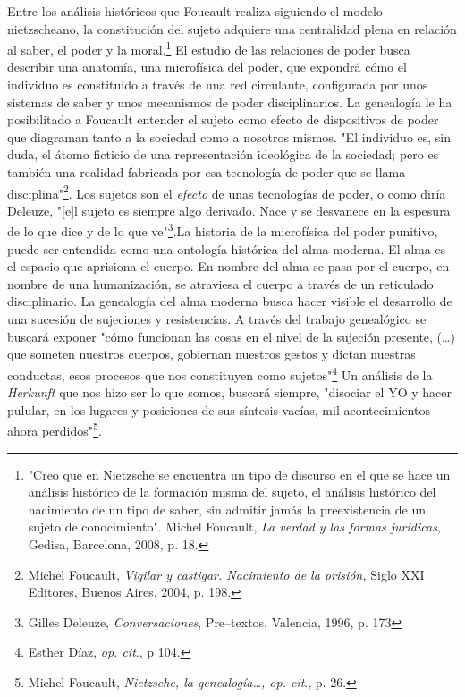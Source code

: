 Entre los análisis históricos que Foucault realiza siguiendo el modelo
nietzscheano, la constitución del sujeto adquiere una centralidad plena
en relación al saber, el poder y la moral.\footnote{"Creo que en
  Nietzsche se encuentra un tipo de discurso en el que se hace un
  análisis histórico de la formación misma del sujeto, el análisis
  histórico del nacimiento de un tipo de saber, sin admitir jamás la
  preexistencia de un sujeto de conocimiento". Michel Foucault, \emph{La
  verdad y las formas jurídicas}, Gedisa, Barcelona, 2008, p. 18.} El
estudio de las relaciones de poder busca describir una anatomía, una
microfísica del poder, que expondrá cómo el individuo es constituido a
través de una red circulante, configurada por unos sistemas de saber y
unos mecanismos de poder disciplinarios. La genealogía le ha
posibilitado a Foucault entender el sujeto como efecto de dispositivos
de poder que diagraman tanto a la sociedad como a nosotros mismos. "El
individuo es, sin duda, el átomo ficticio de una representación
ideológica de la sociedad; pero es también una realidad fabricada por
esa tecnología de poder que se llama disciplina"\footnote{Michel
  Foucault, \emph{Vigilar y castigar. Nacimiento de la prisión,} Siglo
  XXI Editores, Buenos Aires, 2004, p. 198.}. Los sujetos son el
\emph{efecto} de unas tecnologías de poder, o como diría Deleuze,
"{[}e{]}l sujeto es siempre algo derivado. Nace y se desvanece en la
espesura de lo que dice y de lo que ve"\footnote{Gilles Deleuze,
  \emph{Conversaciones}, Pre--textos, Valencia, 1996, p. 173}.La
historia de la microfísica del poder punitivo, puede ser entendida como
una ontología histórica del alma moderna. El alma es el espacio que
aprisiona el cuerpo. En nombre del alma se pasa por el cuerpo, en nombre
de una humanización, se atraviesa el cuerpo a través de un reticulado
disciplinario. La genealogía del alma moderna busca hacer visible el
desarrollo de una sucesión de sujeciones y resistencias. A través del
trabajo genealógico se buscará exponer "cómo funcionan las cosas en el
nivel de la sujeción presente, (\dots) que someten nuestros
cuerpos, gobiernan nuestros gestos y dictan nuestras conductas, esos
procesos que nos constituyen como sujetos"\footnote{Esther Díaz,
  \emph{op. cit}., p 104.} Un análisis de la \emph{Herkunft} que nos
hizo ser lo que somos, buscará siempre, "disociar el YO y hacer pulular,
en los lugares y posiciones de sus síntesis vacías, mil acontecimientos
ahora perdidos"\footnote{Michel Foucault, \emph{Nietzsche, la
  genealogía\ldots, op. cit}., p. 26.}.

